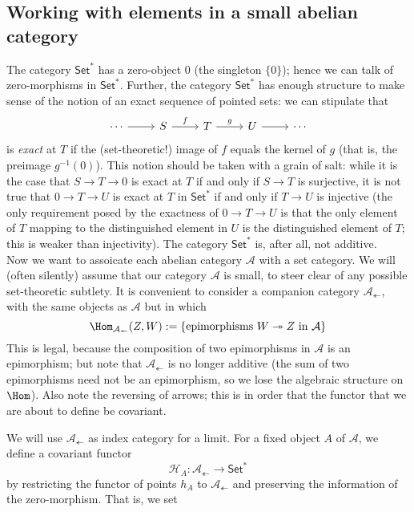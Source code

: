 \subsection{Working with elements in a small abelian category}
The category $\mathsf{Set}^*$ has a zero-object $0$ (the singleton $\{0\}$); hence we can talk of zero-morphisms in $\mathsf{Set}^*$. Further, the category $\mathsf{Set}^*$ has enough structure to make sense of the notion of an exact sequence of pointed sets: we can stipulate that
\[\begin{tikzcd}
\cdots\ar[r]&S\ar[r,"f"]&T\ar[r,"g"]&U\ar[r]&\cdots
\end{tikzcd}\]
is \textit{exact} at $T$ if the (set-theoretic!) image of $f$ equals the kernel of $g$ (that is, the preimage $g^{-1}(0)$). This notion should be taken with a grain of salt: while it is the case that $S\to T\to 0$ is exact at $T$ if and only if $S\to T$ is surjective, it is not true that $0\to T\to U$ is exact at $T$ in $\mathsf{Set}^*$ if and only if $T\to U$ is injective (the only requirement posed by the exactness of $0\to T\to U$ is that the only element of $T$ mapping to the distinguished element in $U$ is the distinguished element of $T$; this is weaker than injectivity). The category $\mathsf{Set}^*$ is, after all, not additive.\\
\vspace{5mm}
Now we want to assoicate each abelian category $\mathcal{A}$ with a set category. We will (often silently) assume that our category $\mathcal{A}$ is small, to steer clear of any possible set-theoretic subtlety. It is convenient to consider a companion category $\mathcal{A}_{\twoheadleftarrow}$, with the same objects as $\mathcal{A}$ but in which
\[\Hom_{\mathcal{A}_{\twoheadleftarrow}}(Z,W):=\{\text{epimorphisms }W\twoheadrightarrow Z\text{ in }\mathcal{A}\}\]
This is legal, because the composition of two epimorphisms in $\mathcal{A}$ is an epimorphism; but note that $\mathcal{A}_{\twoheadleftarrow}$ is no longer additive (the sum of two epimorphisms need not be an epimorphism, so we lose the algebraic structure on $\Hom$). Also note the reversing of arrows; this is in order that the functor that we are about to define be covariant.\par
We will use $\mathcal{A}_{\twoheadleftarrow}$ as index category for a limit. For a fixed object $A$ of $\mathcal{A}$, we define a covariant functor
\[\mathscr{H}_A:\mathcal{A}_{\twoheadleftarrow}\to\mathsf{Set}^*\]
by restricting the functor of points $h_A$ to $\mathcal{A}_{\twoheadleftarrow}$ and preserving the information of the zero-morphism. That is, we set
